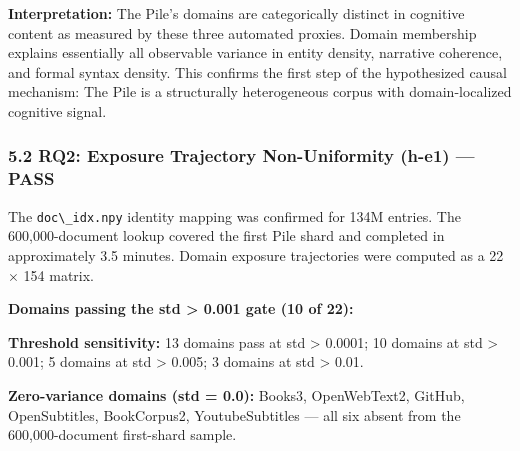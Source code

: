 \textbf{Interpretation:} The Pile's domains are categorically distinct in cognitive content as measured by these three automated proxies. Domain membership explains essentially all observable variance in entity density, narrative coherence, and formal syntax density. This confirms the first step of the hypothesized causal mechanism: The Pile is a structurally heterogeneous corpus with domain-localized cognitive signal.

\subsubsection{5.2 RQ2: Exposure Trajectory Non-Uniformity (h-e1) --- PASS}

The \texttt{doc\textbackslash \_idx.npy} identity mapping was confirmed for 134M entries. The 600,000-document lookup covered the first Pile shard and completed in approximately 3.5 minutes. Domain exposure trajectories were computed as a 22 $\times$ 154 matrix.

\textbf{Domains passing the std > 0.001 gate (10 of 22):}

\begin{table}[htbp]
\centering
{}
\end{table}

\textbf{Threshold sensitivity:} 13 domains pass at std > 0.0001; 10 domains at std > 0.001; 5 domains at std > 0.005; 3 domains at std > 0.01.

\textbf{Zero-variance domains (std = 0.0):} Books3, OpenWebText2, GitHub, OpenSubtitles, BookCorpus2, YoutubeSubtitles --- all six absent from the 600,000-document first-shard sample.

